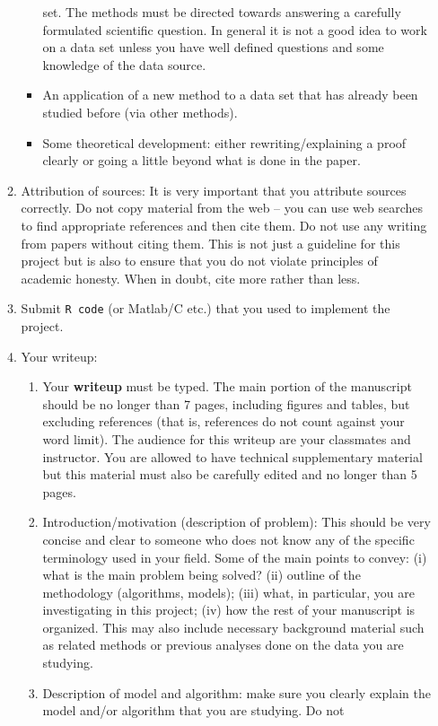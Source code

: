\documentclass[10pts]{article}
\begin{document}
\begin{itemize}
\begin{enumerate}
\begin{itemize}
  set. The methods must be directed towards answering a carefully
  formulated scientific question. In general it is not a good idea to
  work on a data set unless you have well defined questions and some
  knowledge of the data source.
\item An application of a new method to a data set that has already
  been studied before (via other methods).
\item Some theoretical development: either rewriting/explaining a
  proof clearly or going a little beyond what is done in the paper.
\end{itemize}
\item Attribution of sources: It is very important that you attribute
  sources correctly. Do not copy material from the web -- you can use
  web searches to find appropriate references and then cite them. Do
  not use any writing from papers without citing them. This is not
  just a guideline for this project but is also to ensure that you do
  not violate principles of academic honesty. When in doubt, cite more
  rather than less.
\item Submit {\tt R code} (or Matlab/C etc.) that you used to
  implement the project. 
\item Your writeup: 
  \begin{enumerate}
  \item Your {\bf writeup} must be typed. The main portion of the
    manuscript should be no longer than 7 pages, including
    figures and tables, but excluding references (that is, references
    do not count against your word limit). The audience for this
    writeup are your classmates and instructor. You are allowed to
    have technical supplementary material but this material must also
    be carefully edited and no longer than 5 pages.
  \item Introduction/motivation (description of problem): This should
    be very concise and clear to someone who does not know any of the
    specific terminology used in your field. Some of the main points
    to convey: (i) what is the main problem being solved? (ii) outline
    of the methodology (algorithms, models); (iii) what, in
    particular, you are investigating in this project; (iv) how the
    rest of your manuscript is organized. This may also include
    necessary background material such as related methods or previous
    analyses done on the data you are studying.
  \item Description of model and algorithm: make sure you clearly
    explain the model and/or algorithm that you are studying. Do not

\end{enumerate}
\end{enumerate}
\end{itemize}
\end{document}

